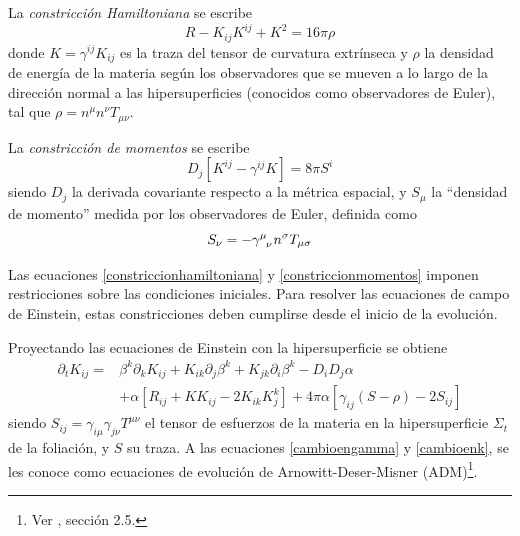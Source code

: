 \documentclass[11pt,twoside,openright,spanish]{report}
\numberwithin{equation}{chapter}
\numberwithin{figure}{chapter}
\numberwithin{table}{chapter}
\begin{document}
La \textit{constricción Hamiltoniana} se escribe
\begin{equation}
R-K_{ij}K^{ij}+K^2=16\pi\rho
\label{constriccionhamiltoniana}
\end{equation}
donde $K=\gamma^{ij}K_{ij}$ es la traza del tensor de curvatura extrínseca y $\rho$ la densidad de energía de la materia según los observadores que se mueven a lo largo de la dirección normal a las hipersuperficies (conocidos como observadores de Euler), tal que $\rho=n^\mu n^\nu T_{\mu\nu}$.

La \textit{constricción de momentos} se escribe
\begin{equation}
D_j[K^{ij}-\gamma^{ij}K]=8\pi S^{i}
\label{constriccionmomentos}
\end{equation}
siendo $D_j$ la derivada covariante respecto a la métrica espacial, y $S_\mu$ la ``densidad de momento'' medida por los observadores de Euler, definida como
\begin{equation}
S_\nu=-\tensor{\gamma}{^\mu_\nu}n^\sigma T_{\mu\sigma}
\end{equation}

Las ecuaciones \eqref{constriccionhamiltoniana} y \eqref{constriccionmomentos} imponen restricciones sobre las condiciones iniciales. Para resolver las ecuaciones de campo de Einstein, estas constricciones deben cumplirse desde el inicio de la evolución.

Proyectando las ecuaciones de Einstein con la hipersuperficie se obtiene
\begin{align}
\nonumber
\partial_t K_{ij}=&\beta^{k}\partial_k K_{ij}+K_{ik}\partial_j \beta^k+K_{jk}\partial_i\beta^k-D_iD_j\alpha\\
&+\alpha\left[R_{ij}+KK_{ij}-2K_{ik}K^k_j\right]+4\pi\alpha\left[\gamma_{ij}\left(S-\rho\right)- 2S_{ij}\right]\label{cambioenk}
\end{align}
siendo $S_{ij}=\gamma_{i\mu}\gamma_{j\nu} T^{\mu\nu}$ el tensor de esfuerzos de la materia en la hipersuperficie $\Sigma_t$ de la foliación, y $S$ su traza. A las ecuaciones \eqref{cambioengamma} y \eqref{cambioenk}, se les conoce como ecuaciones de evolución de Arnowitt-Deser-Misner (ADM)\footnote{Ver \citet{alcubierre}, sección 2.5.}. 
\end{document}
